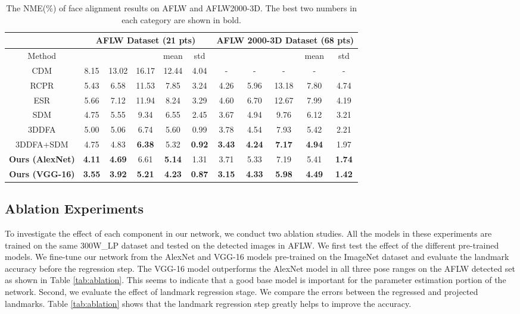 \documentclass[10pt,twocolumn,letterpaper]{article}
\begin{document}
\begin{table*}[t!]
\centering
\caption{The NME(\%) of face alignment results on AFLW and AFLW2000-3D. The best two numbers in each category are shown in bold.}
\label{tab:exp_results}
\begin{tabular}{|c||c|c|c|c|c||c|c|c|c|c|}
\hline
 & \multicolumn{5}{c||}{AFLW Dataset (21 pts)} & \multicolumn{5}{c|}{AFLW 2000-3D Dataset (68 pts)} \\ \hline
Method &  &  &  & mean & std &  &  &  & mean & std \\ \hline
CDM & 8.15 & 13.02 & 16.17 & 12.44 & 4.04 & - & - & - & - & - \\ \hline
RCPR & 5.43 & 6.58 & 11.53 & 7.85 & 3.24 & 4.26 & 5.96 & 13.18 & 7.80 & 4.74\\ \hline
ESR & 5.66 & 7.12 & 11.94 & 8.24 & 3.29 & 4.60 & 6.70 & 12.67 & 7.99 & 4.19 \\ \hline
SDM & 4.75 & 5.55 & 9.34 & 6.55 & 2.45 & 3.67 & 4.94 & 9.76 & 6.12 & 3.21 \\ \hline
3DDFA & 5.00 & 5.06 & 6.74 & 5.60 & 0.99 & 3.78 & 4.54 & 7.93 & 5.42 & 2.21 \\ \hline
3DDFA+SDM & 4.75 & 4.83 & \textbf{6.38} & 5.32 & \textbf{0.92} & \textbf{3.43} & \textbf{4.24} & \textbf{7.17} & \textbf{4.94} & 1.97 \\
\hline
\textbf{Ours (AlexNet)} &\textbf{4.11} & \textbf{4.69} & 6.61 & \textbf{5.14} & 1.31 & 3.71 & 5.33 & 7.19 & 5.41 & \textbf{1.74} \\ \hline
\textbf{Ours (VGG-16)} & \textbf{3.55} & \textbf{3.92} & \textbf{5.21} & \textbf{4.23} & \textbf{0.87} & \textbf{3.15} & \textbf{4.33} & \textbf{5.98} & \textbf{4.49} & \textbf{1.42}  \\ \hline
\end{tabular}
\end{table*}

\subsection{Ablation Experiments}
To investigate the effect of each component in our network, we conduct two ablation studies. All the models in these experiments are trained on the same 300W\_LP dataset and tested on the detected images in AFLW. We first test the effect of the different pre-trained models. We fine-tune our network from the AlexNet and VGG-16 models pre-trained on the ImageNet dataset and evaluate the landmark accuracy before the regression step. The VGG-16 model outperforms the AlexNet model in all three pose ranges on the AFLW detected set as shown in Table \ref{tab:ablation}. This seems to indicate that a good base model is important for the parameter estimation portion of the network. Second, we evaluate the effect of landmark regression stage. We compare the errors between the regressed and projected landmarks. Table \ref{tab:ablation} shows that the landmark regression step greatly helps to improve the accuracy.
\end{document}
